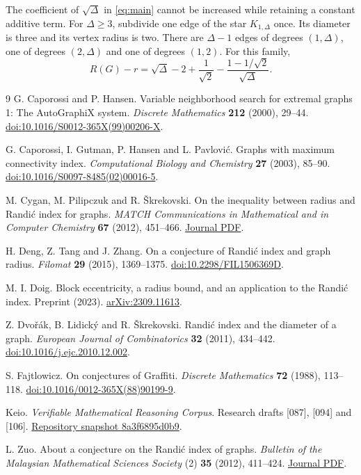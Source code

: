 \documentclass[11pt,a4paper]{article}
\begin{document}
The coefficient of $\sqrt{\Delta}$ in \eqref{eq:main} cannot be
increased while retaining a constant additive term. For $\Delta\ge3$,
subdivide one edge of the star $K_{1,\Delta}$ once. Its diameter is
three and its vertex radius is two. There are $\Delta-1$ edges of
degrees $(1,\Delta)$, one of degrees $(2,\Delta)$ and one of degrees
$(1,2)$. For this family,
\[
 R(G)-r=\sqrt{\Delta}-2+\frac1{\sqrt2}
            -\frac{1-1/\sqrt2}{\sqrt{\Delta}} .
\]

\begin{thebibliography}{9}
G. Caporossi and P. Hansen.
Variable neighborhood search for extremal graphs 1: The AutoGraphiX system.
\emph{Discrete Mathematics} \textbf{212} (2000), 29--44.
\href{https://doi.org/10.1016/S0012-365X(99)00206-X}{doi:10.1016/S0012-365X(99)00206-X}.

G. Caporossi, I. Gutman, P. Hansen and L. Pavlovi\'c.
Graphs with maximum connectivity index.
\emph{Computational Biology and Chemistry} \textbf{27} (2003), 85--90.
\href{https://doi.org/10.1016/S0097-8485(02)00016-5}{doi:10.1016/S0097-8485(02)00016-5}.

M. Cygan, M. Pilipczuk and R. \v{S}krekovski.
On the inequality between radius and Randi\'c index for graphs.
\emph{MATCH Communications in Mathematical and in Computer Chemistry}
\textbf{67} (2012), 451--466.
\href{https://match.pmf.kg.ac.rs/electronic_versions/Match67/n2/match67n2_451-466.pdf}{Journal PDF}.

H. Deng, Z. Tang and J. Zhang.
On a conjecture of Randi\'c index and graph radius.
\emph{Filomat} \textbf{29} (2015), 1369--1375.
\href{https://doi.org/10.2298/FIL1506369D}{doi:10.2298/FIL1506369D}.

M. I. Doig.
Block eccentricity, a radius bound, and an application to the Randi\'c index.
Preprint (2023). \href{https://arxiv.org/abs/2309.11613}{arXiv:2309.11613}.

Z. Dvo\v{r}\'ak, B. Lidick\'y and R. \v{S}krekovski.
Randi\'c index and the diameter of a graph.
\emph{European Journal of Combinatorics} \textbf{32} (2011), 434--442.
\href{https://doi.org/10.1016/j.ejc.2010.12.002}{doi:10.1016/j.ejc.2010.12.002}.

S. Fajtlowicz.
On conjectures of Graffiti.
\emph{Discrete Mathematics} \textbf{72} (1988), 113--118.
\href{https://doi.org/10.1016/0012-365X(88)90199-9}{doi:10.1016/0012-365X(88)90199-9}.

Keio.
\emph{Verifiable Mathematical Reasoning Corpus}.
Research drafts [087], [094] and [106].
\href{https://github.com/QEEDDD/Verifiable-Mathematical-Reasoning-Corpus/tree/8a3f6895d0b9b9f125e43157e4a003a2a2b51704}{Repository snapshot 8a3f6895d0b9}.

L. Zuo.
About a conjecture on the Randi\'c index of graphs.
\emph{Bulletin of the Malaysian Mathematical Sciences Society}
(2) \textbf{35} (2012), 411--424.
\href{https://math.usm.my/bulletin/pdf/v35n2/v35n2p16.pdf}{Journal PDF}.
\end{thebibliography}
\end{document}
